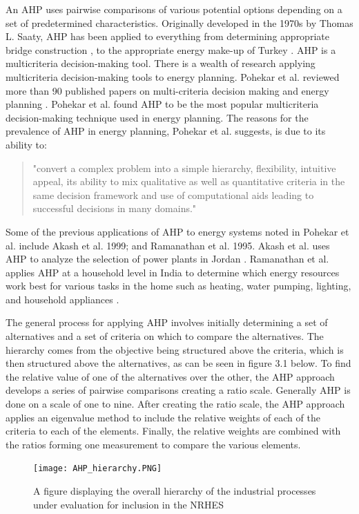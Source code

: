An AHP uses pairwise comparisons of various potential options depending on a set of predetermined characteristics. Originally developed in the 1970s by Thomas L. Saaty, AHP has been applied to everything from determining appropriate bridge construction \cite{Pan2008}, to the appropriate energy make-up of Turkey\cite{Kahraman2010} \cite{Saaty1987}. AHP is a multicriteria decision-making tool. There is a wealth of research applying multicriteria decision-making tools to energy planning. Pohekar et al. reviewed more than 90 published papers on multi-criteria decision making and energy planning \cite{Pohekar2004}. Pohekar et al. found AHP to be the most popular multicriteria decision-making technique used in energy planning. The reasons for the prevalence of AHP in energy planning, Pohekar et al. suggests, is due to its ability to:
\begin{quote}
	"convert a complex problem into a simple hierarchy, flexibility, intuitive appeal, its ability to mix qualitative as well as quantitative criteria in the same decision framework and use of computational aids leading to successful decisions in many domains.\cite{Pohekar2004}"
 \end{quote}
Some of the previous applications of AHP to energy systems noted in Pohekar et al. include Akash et al.  1999; and Ramanathan et al. 1995. Akash et al. uses AHP to analyze the selection of power plants in Jordan \cite{Akash1999}.  Ramanathan et al. applies AHP at a household level in India to determine which energy resources work best for various tasks in the home such as heating, water pumping, lighting, and household appliances \cite{Ramanathan1995}.

The general process for applying AHP involves initially determining a set of alternatives and a set of criteria on which to compare the alternatives. The hierarchy comes from the objective being structured above the criteria, which is then structured above the alternatives, as can be seen in figure 3.1 below. To find the relative value of one of the alternatives over the other, the AHP approach develops a series of pairwise comparisons creating a ratio scale.  Generally AHP is done on a scale of one to nine. After creating the ratio scale, the AHP approach applies an eigenvalue method to include the relative weights of each of the criteria to each of  the elements. Finally, the relative weights are combined with the ratios forming one measurement to compare the various elements.

\begin{figure}[h!]
  \centering
  \texttt{[image: AHP\_hierarchy.PNG]}
  \caption{A figure displaying the overall hierarchy of the industrial processes under evaluation for inclusion in the NRHES}
\end{figure}

